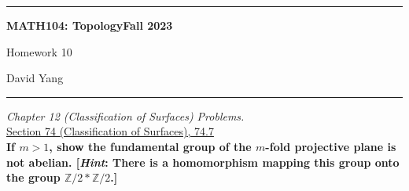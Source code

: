 \documentclass[11pt]{article}
\newcommand{\Z}{\mathbb{Z}}
\begin{document}
	\hrule
	\begin{center}
        \textbf{MATH104: Topology}\hfill \textbf{Fall 2023}\newline

		{\Large Homework 10}

		David Yang
	\end{center}

\hrule

\vspace{1em}

\textit{Chapter 12 (Classification of Surfaces) Problems.} \\

\underline{Section 74 (Classification of Surfaces), 74.7} \\

\textbf{If $m > 1$, show the fundamental group of the $m$-fold projective plane is not abelian. [\textit{Hint}: There is a homomorphism mapping this group onto the group $\Z / 2 * \Z / 2$.]}
\end{document}

